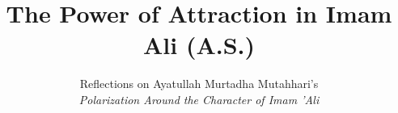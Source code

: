 \documentclass[11pt,aspectratio=169]{beamer}
\title{The Power of Attraction in Imam Ali (A.S.)}
\subtitle{Reflections on Ayatullah Murtadha Mutahhari's\\ \textit{Polarization Around the Character of Imam 'Ali}}
\author{\presentername}
\date{} %
\begin{document}
\begin{frame}[plain]
  \titlepage
\end{frame}









\end{document}
